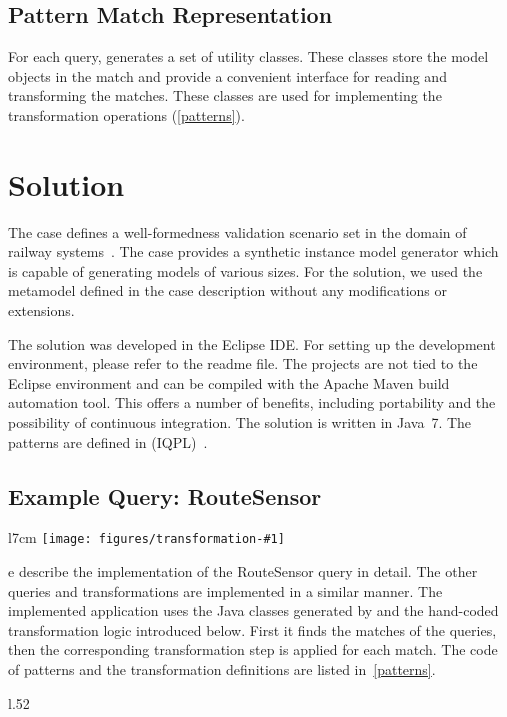 \documentclass[submission,copyright,creativecommons]{eptcs}
\newcommand{\ttctransformation}[2]{
	\begin{wrapfigure}{l}{7cm}
		\centering
		\vspace{-1em}
		\texttt{[image: figures/transformation-\#1]}
		\vspace{-3em}
	\end{wrapfigure}
}
\begin{document}
\subsection{Pattern Match Representation}

For each query, \eiq generates a set of utility classes. These classes store the model objects in the match and provide a convenient interface for reading and transforming the matches. These classes are used for implementing the transformation operations (\autoref{patterns}).

\section{Solution}

The case defines a well-formedness validation scenario set in the domain of railway systems~\cite{ttc-trainbenchmark-case}. The case provides a synthetic instance model generator which is capable of generating models of various sizes. For the solution, we used the metamodel defined in the case description without any modifications or extensions.

The solution was developed in the Eclipse IDE. For setting up the development environment, please refer to the readme file. The projects are not tied to the Eclipse environment and can be compiled with the Apache Maven build automation tool. This offers a number of benefits, including portability and the possibility of continuous integration. The solution is written in Java~7. The patterns are defined in \iqpl (IQPL)~\cite{iqpl}.

\subsection{Example Query: \textsf{RouteSensor}}
\label{routesensor}

\ttctransformation{routesensor}

We describe the implementation of the \textsf{RouteSensor} query in detail. The other queries and transformations are implemented in a similar manner. The implemented application uses the Java classes generated by \eiq and the hand-coded transformation logic introduced below. First it finds the matches of the queries, then the corresponding transformation step is applied for each match. The code of patterns and the transformation definitions are listed in~\autoref{patterns}.

\begin{wrapfigure}[12]{l}{.52\textwidth}
\end{wrapfigure}
\end{document}
